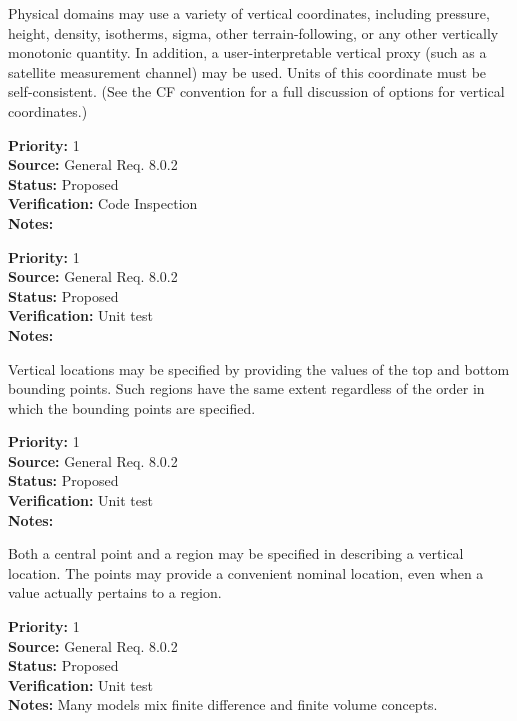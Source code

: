 

Physical domains may use a variety of vertical coordinates, including pressure,
height, density, isotherms, sigma, other terrain-following, or any other
vertically monotonic quantity.  In addition, a user-interpretable vertical
proxy (such as a satellite measurement channel) may be used.  Units of this
coordinate must be self-consistent.  (See the CF convention for a full
discussion of options for vertical coordinates.)
\begin{reqlist}
{\bf Priority:} 1 \\
{\bf Source:} General Req. 8.0.2 \\
{\bf Status:} Proposed \\
{\bf Verification:} Code Inspection\\
{\bf Notes:} 
\end{reqlist}

\begin{reqlist}
{\bf Priority:} 1 \\
{\bf Source:} General Req. 8.0.2 \\
{\bf Status:} Proposed \\
{\bf Verification:} Unit test\\
{\bf Notes:} 
\end{reqlist}


Vertical locations may be specified by providing the values of the top and
bottom bounding points.  Such regions have the same extent regardless of the
order in which the bounding points are specified.
\begin{reqlist}
{\bf Priority:} 1 \\
{\bf Source:} General Req. 8.0.2 \\
{\bf Status:} Proposed \\
{\bf Verification:} Unit test\\
{\bf Notes:} 
\end{reqlist}


  Both a central point and a region may be specified in describing a vertical
location.  The points may provide a convenient nominal location, even when
a value actually pertains to a region.
\begin{reqlist}
{\bf Priority:} 1 \\
{\bf Source:} General Req. 8.0.2 \\
{\bf Status:} Proposed \\
{\bf Verification:} Unit test\\
{\bf Notes:} Many models mix finite difference and finite volume concepts.
\end{reqlist}

